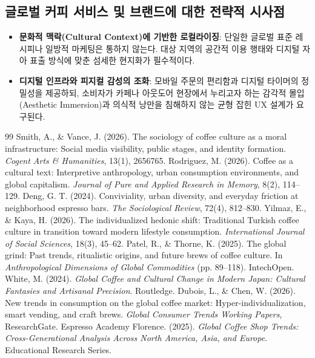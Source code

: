 \documentclass[10pt,a4paper]{article}
\begin{document}
\subsection{글로벌 커피 서비스 및 브랜드에 대한 전략적 시사점}
\begin{itemize}[itemsep=3pt]
    \item \textbf{문화적 맥락(Cultural Context)에 기반한 로컬라이징}: 단일한 글로벌 표준 레시피나 일방적 마케팅은 통하지 않는다. 대상 지역의 공간적 이용 행태와 디지털 자아 표출 방식에 맞춘 섬세한 현지화가 필수적이다.
    \item \textbf{디지털 인프라와 피지컬 감성의 조화}: 모바일 주문의 편리함과 디지털 타이머의 정밀성을 제공하되, 소비자가 카페나 아웃도어 현장에서 누리고자 하는 감각적 몰입(Aesthetic Immersion)과 의식적 낭만을 침해하지 않는 균형 잡힌 UX 설계가 요구된다.
\end{itemize}

\begin{thebibliography}{99}
 Smith, A., \& Vance, J. (2026). The sociology of coffee culture as a moral infrastructure: Social media visibility, public stages, and identity formation. \textit{Cogent Arts \& Humanities}, 13(1), 2656765.
 Rodriguez, M. (2026). Coffee as a cultural text: Interpretive anthropology, urban consumption environments, and global capitalism. \textit{Journal of Pure and Applied Research in Memory}, 8(2), 114--129.
 Deng, G. T. (2024). Conviviality, urban diversity, and everyday friction at neighborhood espresso bars. \textit{The Sociological Review}, 72(4), 812--830.
 Yilmaz, E., \& Kaya, H. (2026). The individualized hedonic shift: Traditional Turkish coffee culture in transition toward modern lifestyle consumption. \textit{International Journal of Social Sciences}, 18(3), 45--62.
 Patel, R., \& Thorne, K. (2025). The global grind: Past trends, ritualistic origins, and future brews of coffee culture. In \textit{Anthropological Dimensions of Global Commodities} (pp. 89--118). IntechOpen.
 White, M. (2024). \textit{Global Coffee and Cultural Change in Modern Japan: Cultural Fantasies and Artisanal Precision}. Routledge.
 Dubois, L., \& Chen, W. (2026). New trends in consumption on the global coffee market: Hyper-individualization, smart vending, and craft brews. \textit{Global Consumer Trends Working Papers}, ResearchGate.
 Espresso Academy Florence. (2025). \textit{Global Coffee Shop Trends: Cross-Generational Analysis Across North America, Asia, and Europe}. Educational Research Series.
\end{thebibliography}
\end{document}
